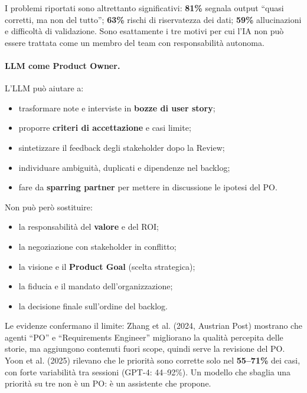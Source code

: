\documentclass[12pt]{extarticle}
\begin{document}
\noindent I problemi riportati sono altrettanto significativi: \textbf{81\%} segnala output ``quasi corretti, ma non del tutto''; \textbf{63\%} rischi di riservatezza dei dati; \textbf{59\%} allucinazioni e difficoltà di validazione. Sono esattamente i tre motivi per cui l'IA non può essere trattata come un membro del team con responsabilità autonoma.

\paragraph{LLM come Product Owner.}
L'LLM può aiutare a:
\begin{itemize}
    \item trasformare note e interviste in \textbf{bozze di user story};
    \item proporre \textbf{criteri di accettazione} e casi limite;
    \item sintetizzare il feedback degli stakeholder dopo la Review;
    \item individuare ambiguità, duplicati e dipendenze nel backlog;
    \item fare da \textbf{sparring partner} per mettere in discussione le ipotesi del PO.
\end{itemize}
\noindent Non può però sostituire:
\begin{itemize}
    \item la responsabilità del \textbf{valore} e del ROI;
    \item la negoziazione con stakeholder in conflitto;
    \item la visione e il \textbf{Product Goal} (scelta strategica);
    \item la fiducia e il mandato dell'organizzazione;
    \item la decisione finale sull'ordine del backlog.
\end{itemize}
\noindent Le evidenze confermano il limite: Zhang et al. (2024, Austrian Post) mostrano che agenti ``PO'' e ``Requirements Engineer'' migliorano la qualità percepita delle storie, ma aggiungono contenuti fuori scope, quindi serve la revisione del PO. Yoon et al. (2025) rilevano che le priorità sono corrette solo nel \textbf{55--71\%} dei casi, con forte variabilità tra sessioni (GPT-4: 44--92\%). Un modello che sbaglia una priorità su tre non è un PO: è un assistente che propone.
\end{document}
